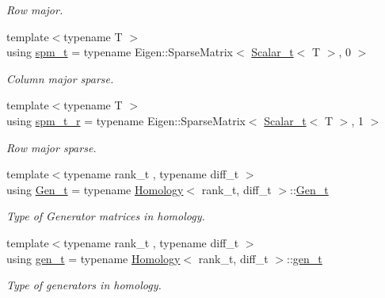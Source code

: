 \begin{DoxyCompactItemize}
\begin{DoxyCompactList}\small\item\em Row major. \end{DoxyCompactList}\item 
{\footnotesize template$<$typename T $>$ }\\using \hyperlink{namespaceMackey_a6fae5aa6894681eabd63f02c387ac618}{spm\+\_\+t} = typename Eigen\+::\+Sparse\+Matrix$<$ \hyperlink{namespaceMackey_a93ba297573961f91101fb84bc84bbe95}{Scalar\+\_\+t}$<$ T $>$, 0 $>$
\begin{DoxyCompactList}\small\item\em Column major sparse. \end{DoxyCompactList}\item 
{\footnotesize template$<$typename T $>$ }\\using \hyperlink{namespaceMackey_a43f350029dd91403df428883f202a7b6}{spm\+\_\+t\+\_\+r} = typename Eigen\+::\+Sparse\+Matrix$<$ \hyperlink{namespaceMackey_a93ba297573961f91101fb84bc84bbe95}{Scalar\+\_\+t}$<$ T $>$, 1 $>$
\begin{DoxyCompactList}\small\item\em Row major sparse. \end{DoxyCompactList}\item 
{\footnotesize template$<$typename rank\+\_\+t , typename diff\+\_\+t $>$ }\\using \hyperlink{namespaceMackey_a5048063727afe2ed842d6bff76cef28e}{Gen\+\_\+t} = typename \hyperlink{classMackey_1_1Homology}{Homology}$<$ rank\+\_\+t, diff\+\_\+t $>$\+::\hyperlink{namespaceMackey_a5048063727afe2ed842d6bff76cef28e}{Gen\+\_\+t}
\begin{DoxyCompactList}\small\item\em Type of Generator matrices in homology. \end{DoxyCompactList}\item 
{\footnotesize template$<$typename rank\+\_\+t , typename diff\+\_\+t $>$ }\\using \hyperlink{namespaceMackey_a6bb0b2796632ba6c7f8ea192f7aecffe}{gen\+\_\+t} = typename \hyperlink{classMackey_1_1Homology}{Homology}$<$ rank\+\_\+t, diff\+\_\+t $>$\+::\hyperlink{namespaceMackey_a6bb0b2796632ba6c7f8ea192f7aecffe}{gen\+\_\+t}
\begin{DoxyCompactList}\small\item\em Type of generators in homology. \end{DoxyCompactList}\end{DoxyCompactItemize}
